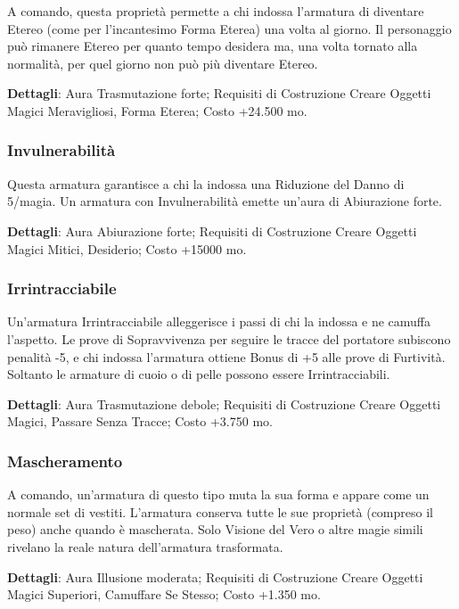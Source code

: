 \begin{multicols}{2}
A comando, questa proprietà permette a chi indossa l'armatura di diventare Etereo (come per l'incantesimo Forma Eterea) una volta al giorno. Il personaggio può rimanere Etereo per quanto tempo desidera ma, una volta tornato alla normalità, per quel giorno non può più diventare Etereo.

\textbf{Dettagli}: Aura Trasmutazione forte; Requisiti di Costruzione Creare Oggetti Magici Meravigliosi, Forma Eterea; Costo +24.500 mo.

\subsubsection*{Invulnerabilità}

Questa armatura garantisce a chi la indossa una Riduzione del Danno di 5/magia. Un armatura con Invulnerabilità emette un'aura di Abiurazione forte.

\textbf{Dettagli}: Aura Abiurazione forte; Requisiti di Costruzione Creare Oggetti Magici Mitici, Desiderio; Costo +15000 mo.

\subsubsection*{Irrintracciabile}

Un'armatura Irrintracciabile alleggerisce i passi di chi la indossa e ne camuffa l'aspetto. Le prove di Sopravvivenza per seguire le tracce del portatore subiscono penalità -5, e chi indossa l'armatura ottiene Bonus di +5 alle prove di Furtività. Soltanto le armature di cuoio o di pelle possono essere Irrintracciabili.

\textbf{Dettagli}: Aura Trasmutazione debole; Requisiti di Costruzione Creare Oggetti Magici, Passare Senza Tracce; Costo +3.750 mo.

\subsubsection*{Mascheramento}

A comando, un'armatura di questo tipo muta la sua forma e appare come un normale set di vestiti. L'armatura conserva tutte le sue proprietà (compreso il peso) anche quando è mascherata. Solo Visione del Vero o altre magie simili rivelano la reale natura dell'armatura trasformata.

\textbf{Dettagli}: Aura Illusione moderata; Requisiti di Costruzione Creare Oggetti Magici Superiori, Camuffare Se Stesso; Costo +1.350 mo.


\end{multicols}
